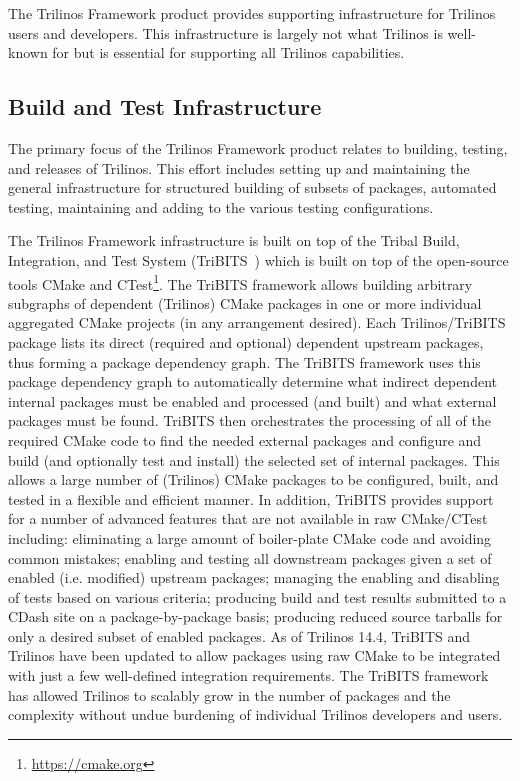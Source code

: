 
The Trilinos Framework product provides supporting infrastructure for Trilinos users and developers. This infrastructure is largely not what Trilinos is well-known for but is essential for supporting all Trilinos capabilities.

\subsection{Build and Test Infrastructure}

The primary focus of the Trilinos Framework product relates to building, testing, and releases of Trilinos. This effort includes setting up and maintaining the general infrastructure for structured building of subsets of packages, automated testing, maintaining and adding to the various testing configurations.

The Trilinos Framework infrastructure is built on top of the Tribal Build, Integration, and Test System (TriBITS~\cite{Bartlett2014}) which is built on top of the open-source tools CMake and CTest\footnote{\url{https://cmake.org}}.
The TriBITS framework allows building arbitrary subgraphs of dependent (Trilinos) CMake packages in one or more individual aggregated CMake projects (in any arrangement desired).
Each Trilinos/TriBITS package lists its direct (required and optional) dependent upstream packages, thus forming a package dependency graph.
The TriBITS framework uses this package dependency graph to automatically determine what indirect dependent internal packages must be enabled and processed (and built) and what external packages must be found.
TriBITS then orchestrates the processing of all of the required CMake code to find the needed external packages and configure and build (and optionally test and install) the selected set of internal packages.
This allows a large number of (Trilinos) CMake packages to be configured, built, and tested in a flexible and efficient manner.
In addition, TriBITS provides support for a number of advanced features that are not available in raw CMake/CTest including: eliminating a large amount of boiler-plate CMake code and avoiding common mistakes; enabling and testing all downstream packages given a set of enabled (i.e. modified) upstream packages; managing the enabling and disabling of tests based on various criteria; producing build and test results submitted to a CDash site on a package-by-package basis; producing reduced source tarballs for only a desired subset of enabled packages.
As of Trilinos 14.4, TriBITS and Trilinos have been updated to allow packages using raw CMake to be integrated with just a few well-defined integration requirements.
The TriBITS framework has allowed Trilinos to scalably grow in the number of packages and the complexity without undue burdening of individual Trilinos developers and users.

